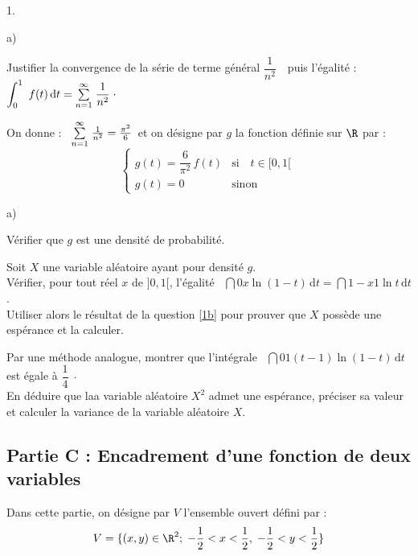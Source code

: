 \documentclass[11pt]{article}%
\begin{document}
\begin{noliste}{1.}
\begin{noliste}{a)}
\item Justifier la convergence de la série de terme général
$\dfrac{1}{n^{2}}$\ \ puis l'égalité : \ $\displaystyle \int_{0}^{1}\ f(t)\,\text{d}t =
{\textstyle\sum\limits_{n = 1}^{\infty }}\hspace{.1cm}\frac{1}{n^{2}}\;\cdotp$
\end{noliste}

\item On donne : \ ${\textstyle\sum\limits_{n = 1}^{\infty }}\hspace{.1cm}\frac{1}{n^{2}} = \frac{\pi
^{2}}{6}$\ et on désigne par $g$ la fonction définie sur $\R$ par : 
\[
\left\{ 
\begin{array}{cc}
g(t) = \dfrac{6}{\pi ^{2}}\,f(t) & \text{si}\quad t\in \lbrack 0,1[ \
\\
g(t) = 0 & \text{sinon}
\end{array}
\right. 
\]

\begin{noliste}{a)}
 \setlength{\itemsep}{2mm}
\item Vérifier que $g$ est une densité de probabilité.

\item Soit $X$ une variable aléatoire ayant pour densité $g$. 
\\
Vérifier, pour tout réel $x$ de $]0,1[$, l'égalité \ $ \dint{0}{x}\ln
(1-t)\,\text{d}t = \dint{1-x}{1}\ln t\,\text{d}t $.\ \\
Utiliser alors le résultat de la question \ref{1b} pour prouver que $X$
possède une espérance et la calculer.

\item Par une méthode analogue, montrer que l'intégrale \ $
\dint{0}{1}(t-1)\ln (1-t)\,\text{d}t$ est égale à
$\dfrac{1}{4}\;\cdotp$ \\
En déduire que laa variable aléatoire $X^{2}$ admet une espérance,
préciser sa valeur et calculer la variance de la variable aléatoire
$X$.
\end{noliste}
\end{noliste}

\subsection*{Partie C : Encadrement d'une fonction de deux variables}

Dans cette partie, on désigne par $V$ l'ensemble ouvert défini par :
\[
V = \{(x,y)\in
\R^{2};\;-\dfrac{1}{2}<x<\dfrac{1}{2},\;-\dfrac{1}{2}<y<\dfrac{1}{2}\}
\]
\end{document}
